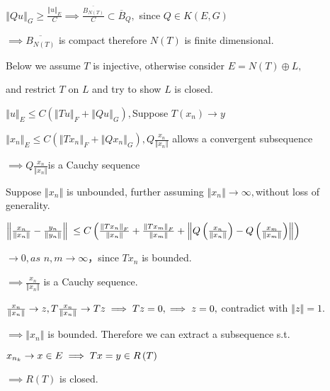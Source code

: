 \documentclass{article}
\begin{document}
$\left\Vert Qu\right\Vert _{G}\geq \frac{\left\Vert u\right\Vert _{E}}{C}%
\implies \frac{\overline{B_{N\left( T\right) }}}{C}\subset \overline{B}_{Q},$%
since $Q\in K\left( E,G\right) $

$\implies \overline{B_{N\left( T\right) }}$ is compact therefore $N\left(
T\right) $ is finite dimensional.

Below we assume $T$ is injective, otherwise consider $E=N\left( T\right)
\oplus L,$

and restrict $T$ on $L$ and try to show $L$ is closed.

\bigskip $\left\Vert u\right\Vert _{E}\leq C\left( \left\Vert Tu\right\Vert
_{F}+\left\Vert Qu\right\Vert _{G}\right) ,$Suppose $T\left( x_{n}\right)
\rightarrow y$

$\left\Vert x_{n}\right\Vert _{E}\leq C\left( \left\Vert Tx_{n}\right\Vert
_{F}+\left\Vert Qx_{n}\right\Vert _{G}\right) ,Q\frac{x_{n}}{\left\Vert
x_{n}\right\Vert }$ allows a convergent subsequence 

$\implies Q\frac{x_{n}}{\left\Vert x_{n}\right\Vert }$is a Cauchy sequence

Suppose $\left\Vert x_{n}\right\Vert $ is unbounded, further assuming $%
\left\Vert x_{n}\right\Vert \rightarrow \infty ,$without loss of generality.

$\left\Vert \frac{x_{n}}{\left\Vert x_{n}\right\Vert }-\frac{y_{n}}{%
\left\Vert y_{n}\right\Vert }\right\Vert $ $\leq C\left( \frac{\left\Vert
Tx_{n}\right\Vert _{F}}{\left\Vert x_{n}\right\Vert }+\frac{\left\Vert
Tx_{m}\right\Vert _{F}}{\left\Vert x_{m}\right\Vert }+\left\Vert Q\left( 
\frac{x_{n}}{\left\Vert x_{n}\right\Vert }\right) -Q\left( \frac{x_{m}}{%
\left\Vert x_{m}\right\Vert }\right) \right\Vert \right) $

$\rightarrow 0,as$ $n,m\rightarrow \infty ， $since $Tx_{n}$ is
bounded.

$\implies \frac{x_{n}}{\left\Vert x_{n}\right\Vert }$ is a Cauchy sequence. 

$\frac{x_{n}}{\left\Vert x_{n}\right\Vert }\rightarrow z,T\frac{x_{n}}{%
\left\Vert x_{n}\right\Vert }\rightarrow Tz\implies Tz=0,\implies z=0,$%
contradict with $\left\Vert z\right\Vert =1.$

$\implies \left\Vert x_{n}\right\Vert $ is bounded. Therefore we can extract
a subsequence s.t.

$\bigskip x_{n_{k}}\rightarrow x\in E\implies Tx=y\in R\left( T\right) $

$\implies R\left( T\right) $ is closed.
\end{document}

